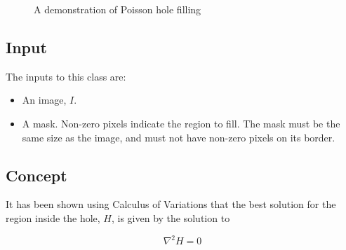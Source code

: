 \documentclass{InsightArticle}
\begin{document}
\begin{figure}[H]
\centering
{}
\caption{A demonstration of Poisson hole filling}
\label{fig:HoleFilling}
\end{figure}

\subsection{Input}
The inputs to this class are:
\begin{itemize}
\item An image, $I$.
\item A mask. Non-zero pixels indicate the region to fill. The mask must be the same size as the image, and must not have non-zero pixels on its border.
\end{itemize}

\subsection{Concept}
It has been shown using Calculus of Variations that the best solution for the region inside the hole, $H$, is given by the solution to 

\begin{equation}
\nabla^2 H = 0
\end{equation}
\end{document}
